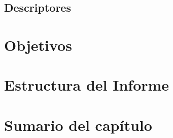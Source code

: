 		\subsection{Descriptores}
			\label{usb:dscr}
			
%		
	\section{Objetivos}
		\label{int:obj}
		
	\section{Estructura del Informe}
		\label{int:est}
		
	\section{Sumario del capítulo} 
		\label{int:res}
		
		
%	
%	